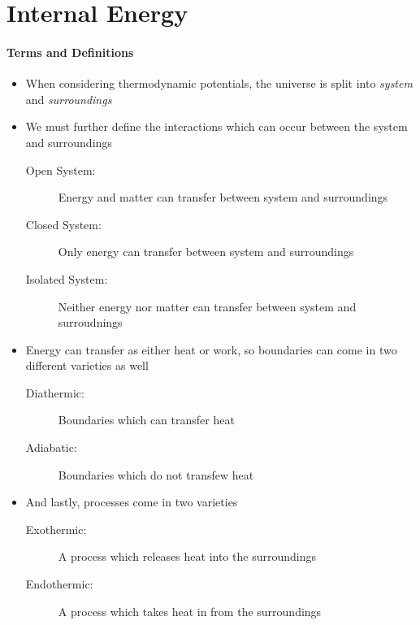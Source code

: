 \documentclass[12pt, openany, letterpaper]{memoir}
\begin{document}
\section{Internal Energy}
\paragraph{Terms and Definitions}
\begin{itemize}
	\item When considering thermodynamic potentials, the universe is split into \emph{system} and \emph{surroundings}
	\item We must further define the interactions which can occur between the system and surroundings
	\begin{description}
		\item [Open System:] Energy and matter can transfer between system and surroundings
		\item [Closed System:] Only energy can transfer between system and surroundings
		\item [Isolated System:] Neither energy nor matter can transfer between system and surroudnings
	\end{description}
	\item Energy can transfer as either heat or work, so boundaries can come in two different varieties as well
	\begin{description}
		\item [Diathermic:] Boundaries which can transfer heat
		\item [Adiabatic:] Boundaries which do not transfew heat
	\end{description}	
	\item And lastly, processes come in two varieties
	\begin{description}
		\item[Exothermic:] A process which releases heat into the surroundings
		\item[Endothermic:] A process which takes heat in from the surroundings
	\end{description}
\end{itemize}
\end{document}
